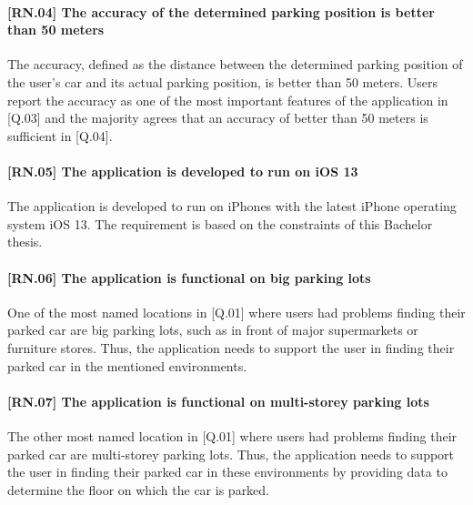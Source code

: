 \paragraph{[RN.04] The accuracy of the determined parking position is better than 50 meters}
The accuracy, defined as the distance between the determined parking position of the user's car and its actual parking position, is better than 50 meters. Users report the accuracy as one of the most important features of the application in [Q.03] and the majority agrees that an accuracy of better than 50 meters is sufficient in [Q.04]. 

\paragraph{[RN.05] The application is developed to run on iOS 13}
The application is developed to run on iPhones with the latest iPhone operating system iOS 13. The requirement is based on the constraints of this Bachelor thesis. 

\paragraph{[RN.06] The application is functional on big parking lots}
One of the most named locations in [Q.01] where users had problems finding their parked car are big parking lots, such as in front of major supermarkets or furniture stores. Thus, the application needs to support the user in finding their parked car in the mentioned environments.

\paragraph{[RN.07] The application is functional on multi-storey parking lots}
The other most named location in [Q.01] where users had problems finding their parked car are multi-storey parking lots. Thus, the application needs to support the user in finding their parked car in these environments by providing data to determine the floor on which the car is parked. 